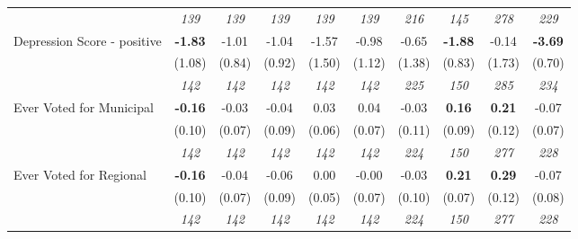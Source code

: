 \begin{tabular}{l c c c c c c c c c}
& \textit{ 139 } & \textit{ 139 } & \textit{ 139 } & \textit{ 139 } & \textit{ 139 } & \textit{ 216 } & \textit{ 145 } & \textit{ 278 } & \textit{ 229 } \\
Depression Score - positive & \textbf{ -1.83 } & -1.01 & -1.04 & -1.57 & -0.98 & -0.65 & \textbf{-1.88} & -0.14 & \textbf{-3.69} \\
& (1.08) & (0.84) & (0.92) & (1.50) & (1.12) & (1.38) & (0.83) & (1.73) & (0.70) \\
& \textit{ 142 } & \textit{ 142 } & \textit{ 142 } & \textit{ 142 } & \textit{ 142 } & \textit{ 225 } & \textit{ 150 } & \textit{ 285 } & \textit{ 234 } \\
Ever Voted for Municipal & \textbf{ -0.16 } & -0.03 & -0.04 & 0.03 & 0.04 & -0.03 & \textbf{0.16} & \textbf{ 0.21 } & -0.07 \\
& (0.10) & (0.07) & (0.09) & (0.06) & (0.07) & (0.11) & (0.09) & (0.12) & (0.07) \\
& \textit{ 142 } & \textit{ 142 } & \textit{ 142 } & \textit{ 142 } & \textit{ 142 } & \textit{ 224 } & \textit{ 150 } & \textit{ 277 } & \textit{ 228 } \\
Ever Voted for Regional & \textbf{ -0.16 } & -0.04 & -0.06 & 0.00 & -0.00 & -0.03 & \textbf{0.21} & \textbf{ 0.29 } & -0.07 \\
& (0.10) & (0.07) & (0.09) & (0.05) & (0.07) & (0.10) & (0.07) & (0.12) & (0.08) \\
& \textit{ 142 } & \textit{ 142 } & \textit{ 142 } & \textit{ 142 } & \textit{ 142 } & \textit{ 224 } & \textit{ 150 } & \textit{ 277 } & \textit{ 228 } \\
\bottomrule
\end{tabular}
